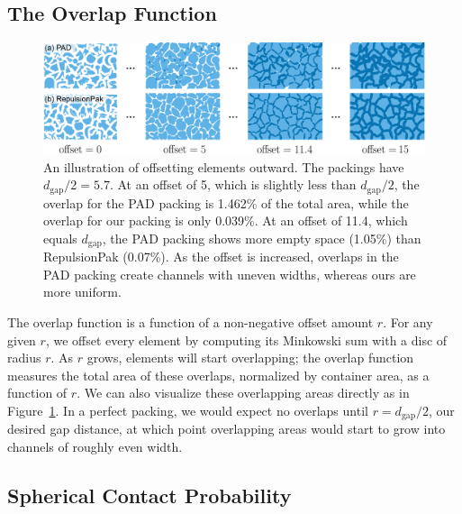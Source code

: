 \subsection{The Overlap Function}

\begin{figure}[t]
\centering
\includegraphics[width=1.0\textwidth]{figures/metrics/overlap_metric.pdf}
\caption[An illustration of offsetting elements outward]
{\label{fig_overlap_function}
    An illustration of offsetting elements outward. The packings have $d_\mathrm{gap} / 2 = 5.7$.  
    At an offset of 5, which is slightly less than $d_\mathrm{gap} / 2$,
    the overlap for the PAD packing is 1.462\% of the total area, while the overlap for our packing is only 0.039\%.
    At an offset of 11.4, which equals $d_\mathrm{gap}$, the PAD packing shows more empty space (1.05\%) than RepulsionPak (0.07\%).
    As the offset is increased, overlaps in the PAD packing create channels
  with uneven widths, whereas ours are more uniform.
  }
\end{figure}

The overlap function is a function of a non-negative offset amount
$r$.  For any given $r$, we offset every element by computing its Minkowski
sum with a disc of radius $r$.  As $r$ grows, elements will start overlapping;
the overlap function measures the total area of these overlaps, normalized
by container area, as a function of $r$.  We can also visualize these 
overlapping areas directly as in Figure~\ref{fig_overlap_function}.  In a 
perfect packing, we would expect no overlaps until $r=d_\mathrm{gap}/2$,
our desired gap distance, at which point overlapping areas would start to
grow into channels of roughly even width.

\subsection{Spherical Contact Probability}

